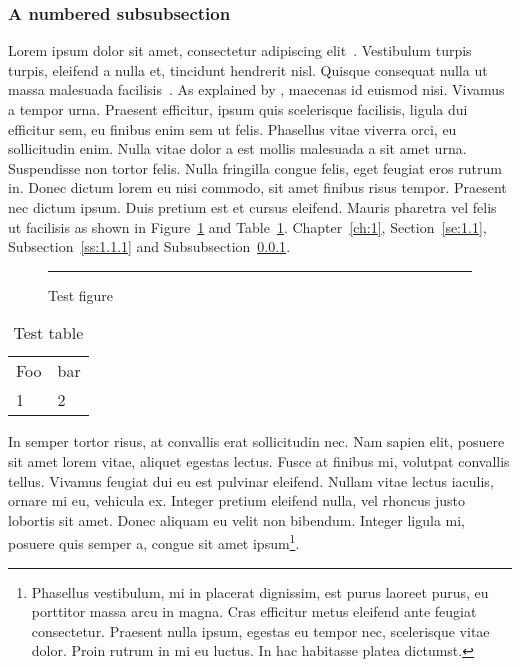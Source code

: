 \documentclass{abe}
\begin{document}
\subsubsection{A numbered subsubsection}
\label{sss:1.1.1.1}
Lorem ipsum dolor sit amet, consectetur adipiscing elit~\citep{Descartes37}. Vestibulum turpis turpis, eleifend a nulla et, tincidunt hendrerit nisl. Quisque consequat nulla ut massa malesuada facilisis~\citep{de-Fermat79}. As explained by \citet{Newton87}, maecenas id euismod nisi. Vivamus a tempor urna. Praesent efficitur, ipsum quis scelerisque facilisis, ligula dui efficitur sem, eu finibus enim sem ut felis. Phasellus vitae viverra orci, eu sollicitudin enim. Nulla vitae dolor a est mollis malesuada a sit amet urna. Suspendisse non tortor felis. Nulla fringilla congue felis, eget feugiat eros rutrum in. Donec dictum lorem eu nisi commodo, sit amet finibus risus tempor. Praesent nec dictum ipsum. Duis pretium est et cursus eleifend. Mauris pharetra vel felis ut facilisis as shown in Figure~\ref{fig:test} and Table~\ref{table:test}. Chapter~\ref{ch:1}, Section~\ref{se:1.1}, Subsection~\ref{ss:1.1.1} and Subsubsection~\ref{sss:1.1.1.1}.

\begin{figure}[htbp]
\rule{2cm}{2cm}
\caption{Test figure}
\label{fig:test}
\end{figure}

\begin{table}[htbp]
\caption{Test table}
\label{table:test}
\begin{tabular}{ll}
Foo & bar \\
1 & 2 \\
\end{tabular}
\end{table}

In semper tortor risus, at convallis erat sollicitudin nec. Nam sapien elit, posuere sit amet lorem vitae, aliquet egestas lectus. Fusce at finibus mi, volutpat convallis tellus. Vivamus feugiat dui eu est pulvinar eleifend. Nullam vitae lectus iaculis, ornare mi eu, vehicula ex. Integer pretium eleifend nulla, vel rhoncus justo lobortis sit amet. Donec aliquam eu velit non bibendum. Integer ligula mi, posuere quis semper a, congue sit amet ipsum\footnote{Phasellus vestibulum, mi in placerat dignissim, est purus laoreet purus, eu porttitor massa arcu in magna. Cras efficitur metus eleifend ante feugiat consectetur. Praesent nulla ipsum, egestas eu tempor nec, scelerisque vitae dolor. Proin rutrum in mi eu luctus. In hac habitasse platea dictumst.}.
\end{document}
